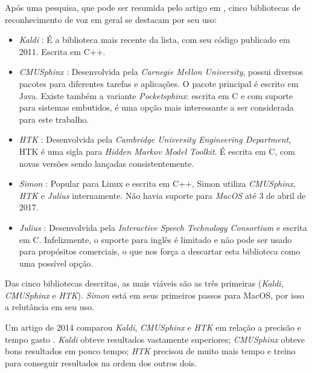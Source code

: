 Após uma pesquisa, que pode ser resumida pelo artigo em \citep{speechRecog:16},
cinco bibliotecas de reconhecimento de voz em geral se destacam por seu uso:

\begin{itemize}
\item \emph{Kaldi} \citep{kaldi}: É a biblioteca mais recente da lista, com seu
código publicado em 2011. Escrita em C++.

\item \emph{CMUSphinx} \citep{cmusphinx}: Desenvolvida pela \emph{Carnegie Mellon
University}, possui diversos pacotes para diferentes tarefas e aplicações. O pacote
principal é escrito em Java. Existe também a variante \emph{Pocketsphinx}: escrita
em C e com suporte para sistemas embutidos, é uma opção mais interessante a ser
considerada para este trabalho.

\item \emph{HTK} \citep{htk}: Desenvolvida pela \emph{Cambridge University
Engineering Department}, HTK é uma sigla para \emph{Hidden Markov Model Toolkit}. É
escrita em C, com novas versões sendo lançadas consistentemente.

\item \emph{Simon} \citep{Simon}: Popular para Linux e escrita em C++, Simon utiliza
\emph{CMUSphinx}, \emph{HTK} e \emph{Julius} internamente. Não havia suporte para
\emph{MacOS} até 3 de abril de 2017.

\item \emph{Julius} \citep{Julius}: Desenvolvida pela \emph{Interactive Speech
Technology Consortium} e escrita em C. Infelizmente, o suporte para inglês é
limitado e não pode ser usado para propósitos comerciais, o que nos força a
descartar esta biblioteca como uma possível opção.
\end{itemize}

Das cinco bibliotecas descritas, as mais viáveis são as três primeiras (\emph{Kaldi},
\emph{CMUSphinx} e \emph{HTK}). \emph{Simon} está em seus primeiros passos para
MacOS, por isso a relutância em seu uso.

Um artigo de 2014 comparou \emph{Kaldi}, \emph{CMUSphinx} e \emph{HTK} em relação a
precisão e tempo gasto \citep{compareSpeech}. \emph{Kaldi} obteve resultados
vastamente superiores; \emph{CMUSphinx} obteve bons resultados em pouco tempo;
\emph{HTK} precisou de muito mais tempo e treino para conseguir resultados na ordem
dos outros dois.


